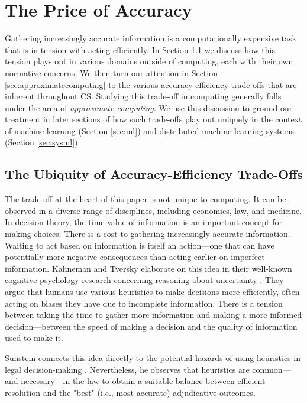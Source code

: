 \documentclass[sigplan,screen]{acmart}
\begin{document}
\section{The Price of Accuracy} \label{sec:price}
Gathering increasingly accurate information is a computationally expensive task that is in tension with acting efficiently. In Section \ref{sec:common} we discuss how this tension plays out in various domains outside of computing, each with their own normative concerns. We then turn our attention in Section \ref{sec:approximatecomputing} to the various accuracy-efficiency trade-offs that are inherent throughout CS. Studying this trade-off in computing generally falls under the area of \emph{approximate computing}. We use this discussion to ground our treatment in later sections of how such trade-offs play out uniquely in the context of machine learning (Section \ref{sec:ml}) and distributed machine learning systems (Section \ref{sec:sysml}).

\subsection{The Ubiquity of Accuracy-Efficiency Trade-Offs} \label{sec:common}
The trade-off at the heart of this paper is not unique to computing. It can be observed in a diverse range of disciplines, including economics, law, and medicine. In decision theory, the time-value of information is an important concept for making choices. There is a cost to gathering increasingly accurate information. Waiting to act based on information is itself an action---one that can have potentially more negative consequences than acting earlier on imperfect information. Kahneman and Tversky elaborate on this idea in their well-known cognitive psychology research concerning reasoning about uncertainty \cite{kahneman1982uncertainty}. They argue that humans use various heuristics to make decisions more efficiently, often acting on biases they have due to incomplete information. There is a tension between taking the time to gather more information and making a more informed decision---between the speed of making a decision and the quality of information used to make it.

Sunstein connects this idea directly to the potential hazards of using heuristics in legal decision-making \cite{sunstein2002heuristics}. Nevertheless, he observes that heuristics are common---and necessary---in the law to obtain a suitable balance between efficient resolution and the "best" (i.e., most accurate) adjudicative outcomes.
\end{document}
